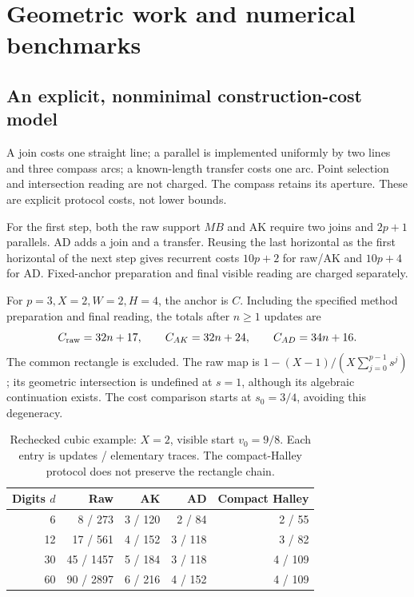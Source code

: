 \documentclass[11pt,a4paper]{article}
\theoremstyle{remark}\newtheorem{remark}[theorem]{Remark}
\numberwithin{equation}{section}
\begin{document}
\section{Geometric work and numerical benchmarks}\label{sec:bench}
\subsection{An explicit, nonminimal construction-cost model}
A join costs one straight line; a parallel is implemented uniformly by two lines and three compass arcs; a known-length transfer costs one arc. Point selection and intersection reading are not charged. The compass retains its aperture. These are explicit protocol costs, not lower bounds.

For the first step, both the raw support $MB$ and AK require two joins and $2p+1$ parallels. AD adds a join and a transfer. Reusing the last horizontal as the first horizontal of the next step gives recurrent costs $10p+2$ for raw/AK and $10p+4$ for AD. Fixed-anchor preparation and final visible reading are charged separately.

For $p=3,X=2,W=2,H=4$, the anchor is $C$. Including the specified method preparation and final reading, the totals after $n\ge1$ updates are
\begin{equation}
 C_{\rm raw}=32n+17,\qquad C_{AK}=32n+24,\qquad C_{AD}=34n+16.
\end{equation}
The common rectangle is excluded. The raw map is
$1-(X-1)/(X\sum_{j=0}^{p-1}s^j)$; its geometric intersection is undefined at $s=1$, although its algebraic continuation exists. The cost comparison starts at $s_0=3/4$, avoiding this degeneracy.

\begin{table}[htbp]\centering
\caption{Rechecked cubic example: $X=2$, visible start $v_0=9/8$. Each entry is updates / elementary traces. The compact-Halley protocol does not preserve the rectangle chain.}\label{tab:cost}
\begin{tabular}{@{}rrrrr@{}}\toprule
Digits $d$ & Raw & AK & AD & Compact Halley\\\midrule
6 & 8 / 273 & 3 / 120 & 2 / 84 & 2 / 55\\
12 & 17 / 561 & 4 / 152 & 3 / 118 & 3 / 82\\
30 & 45 / 1457 & 5 / 184 & 3 / 118 & 4 / 109\\
60 & 90 / 2897 & 6 / 216 & 4 / 152 & 4 / 109\\\bottomrule
\end{tabular}
\end{table}
\end{document}
